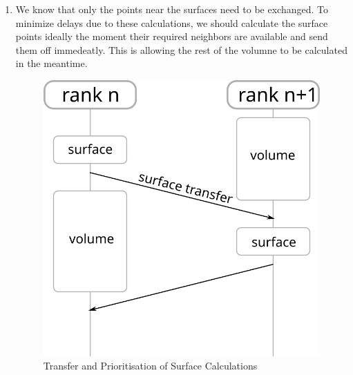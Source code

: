 \documentclass[]{scrartcl}
\begin{document}
\begin{enumerate}
    {\bfseries That means for our use case (big and nearly square grids) the 2D partitioning will always require less points to be exchanged.}

    \item We know that only the points near the surfaces need to be exchanged.
        To minimize delays due to these calculations, we should calculate the surface points ideally the moment their required neighbors are available and send them off immedeatly.
        This is allowing the rest of the volumne to be calculated in the meantime.

    \begin{figure}[H]
        \centering
        \includegraphics[width=.4\linewidth]{img/transfer.png}
        \caption{Transfer and Prioritisation of Surface Calculations}%
        \label{fig:transfer}
    \end{figure}
\end{enumerate}
\end{document}

